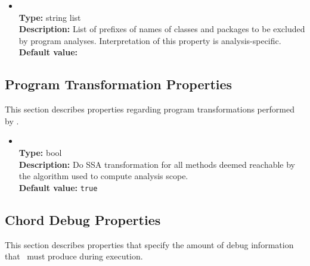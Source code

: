 \begin{itemize}
\item
{} \\
{\bf Type:} string list \\
{\bf Description:} List of prefixes of names of classes and packages to be excluded by program analyses.  Interpretation of this property is analysis-specific. \\
{\bf Default value:} 
\end{itemize}

\subsection{Program Transformation Properties}

This section describes properties regarding program transformations performed by \Chord.

\begin{itemize}
\item
{} \\
{\bf Type:} bool \\
{\bf Description:} Do SSA transformation for all methods deemed reachable by the algorithm used to compute analysis scope. \\
{\bf Default value:} {\tt true} 
\end{itemize}

\subsection{Chord Debug Properties}

This section describes properties that specify the amount of debug information that \Chord\ must produce during execution.

